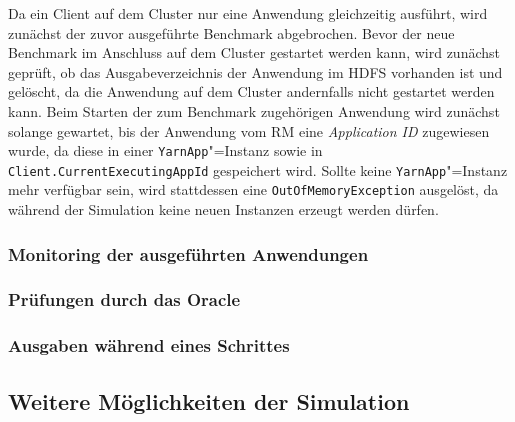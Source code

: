 Da ein Client auf dem Cluster nur eine Anwendung gleichzeitig ausführt, wird zunächst der zuvor ausgeführte Benchmark abgebrochen.
Bevor der neue Benchmark im Anschluss auf dem Cluster gestartet werden kann, wird zunächst geprüft, ob das Ausgabeverzeichnis der Anwendung im \ac{HDFS} vorhanden ist und gelöscht, da die Anwendung auf dem Cluster andernfalls nicht gestartet werden kann.
Beim Starten der zum Benchmark zugehörigen Anwendung wird zunächst solange gewartet, bis der Anwendung vom \ac{RM} eine \emph{Application ID} zugewiesen wurde, da diese in einer \texttt{YarnApp}"=Instanz sowie in \texttt{Client.CurrentExecutingAppId} gespeichert wird.
Sollte keine \texttt{YarnApp}"=Instanz mehr verfügbar sein, wird stattdessen eine \texttt{OutOfMemoryException} ausgelöst, da während der Simulation keine neuen Instanzen erzeugt werden dürfen.

\subsubsection{Monitoring der ausgeführten Anwendungen}\label{sec:simulationMonitoring}


\subsubsection{Prüfungen durch das Oracle}\label{sec:simulationOracle}


\subsubsection{Ausgaben während eines Schrittes}\label{sec:simulationStepOutput}


\subsection{Weitere Möglichkeiten der Simulation}\label{sec:simulationUtilities}
